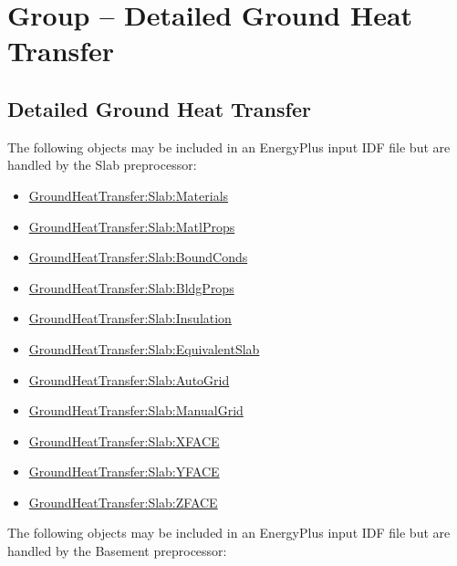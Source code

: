 \section{Group -- Detailed Ground Heat Transfer}\label{group-detailed-ground-heat-transfer}

\subsection{Detailed Ground Heat Transfer}\label{detailed-ground-heat-transfer}

The following objects may be included in an EnergyPlus input IDF file but are handled by the Slab preprocessor:

\begin{itemize}
\tightlist
\item
  \hyperref[group-detailed-ground-heat-transfer]{GroundHeatTransfer:Slab:Materials}
\item
  \hyperref[group-detailed-ground-heat-transfer]{GroundHeatTransfer:Slab:MatlProps}
\item
  \hyperref[group-detailed-ground-heat-transfer]{GroundHeatTransfer:Slab:BoundConds}
\item
  \hyperref[group-detailed-ground-heat-transfer]{GroundHeatTransfer:Slab:BldgProps}
\item
  \hyperref[group-detailed-ground-heat-transfer]{GroundHeatTransfer:Slab:Insulation}
\item
  \hyperref[group-detailed-ground-heat-transfer]{GroundHeatTransfer:Slab:EquivalentSlab}
\item
  \hyperref[group-detailed-ground-heat-transfer]{GroundHeatTransfer:Slab:AutoGrid}
\item
  \hyperref[group-detailed-ground-heat-transfer]{GroundHeatTransfer:Slab:ManualGrid}
\item
  \hyperref[group-detailed-ground-heat-transfer]{GroundHeatTransfer:Slab:XFACE}
\item
  \hyperref[group-detailed-ground-heat-transfer]{GroundHeatTransfer:Slab:YFACE}
\item
  \hyperref[group-detailed-ground-heat-transfer]{GroundHeatTransfer:Slab:ZFACE}
\end{itemize}

The following objects may be included in an EnergyPlus input IDF file but are handled by the Basement preprocessor:

